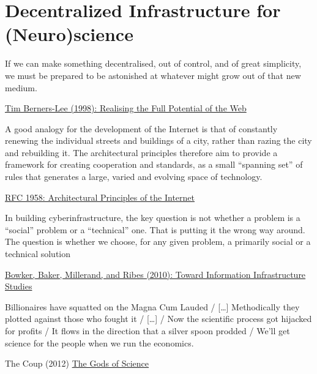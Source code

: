 

\hypertarget{introduction}{%
\chapter{Decentralized Infrastructure for (Neuro)science}\label{introduction}}

\begin{leftbar}
If we can make something decentralised, out of control, and of great
simplicity, we must be prepared to be astonished at whatever might grow
out of that new medium.

\href{https://www.w3.org/1998/02/Potential.html}{Tim Berners-Lee (1998):
Realising the Full Potential of the Web}
\end{leftbar}

\begin{leftbar}
A good analogy for the development of the Internet is that of constantly
renewing the individual streets and buildings of a city, rather than
razing the city and rebuilding it. The architectural principles
therefore aim to provide a framework for creating cooperation and
standards, as a small ``spanning set'' of rules that generates a large,
varied and evolving space of technology.

\href{https://datatracker.ietf.org/doc/html/rfc1958}{RFC 1958:
Architectural Principles of the Internet}
\end{leftbar}

\begin{leftbar}
In building cyberinfrastructure, the key question is not whether a
problem is a ``social'' problem or a ``technical'' one. That is putting
it the wrong way around. The question is whether we choose, for any
given problem, a primarily social or a technical solution

\href{https://doi.org/10.1007/978-1-4020-9789-8_5}{Bowker, Baker,
Millerand, and Ribes (2010): Toward Information Infrastructure Studies}
\citep{bowkerInformationInfrastructureStudies2010} 
\end{leftbar}

\begin{leftbar}
Billionaires have squatted on the Magna Cum Lauded / {[}\ldots{]}
Methodically they plotted against those who fought it / {[}\ldots{]} /
Now the scientific process got hijacked for profits / It flows in the
direction that a silver spoon prodded / We'll get science for the people
when we run the economics.

The Coup (2012) \href{https://youtu.be/lW59xoilGnw}{The Gods of Science}
\end{leftbar}

